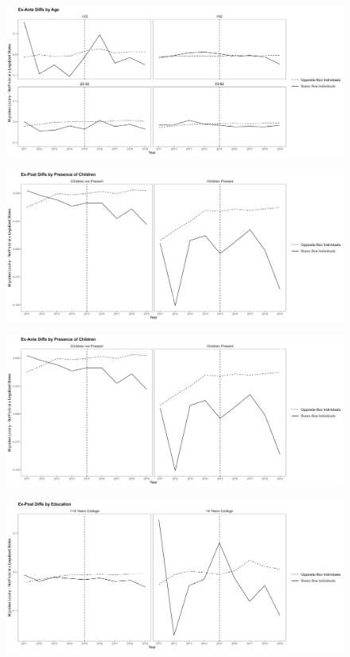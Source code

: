 \documentclass[12pt,letterpaper]{article}
\begin{document}
\begin{figure}[h]
    \centering
    \includegraphics[width=0.75\linewidth]{outputs/summary_stats/age_ante_diffs.png}
    \caption{}
    \label{fig: fig:enter-label}
\end{figure}


\begin{figure}[h]
    \centering
    \includegraphics[width=0.75\linewidth]{outputs/summary_stats/child_post_diffs.png}
    \caption{}
    \label{fig: fig:enter-label}
\end{figure}

\begin{figure}[h]
    \centering
    \includegraphics[width=0.75\linewidth]{outputs/summary_stats/child_ante_diffs.png}
    \caption{}
    \label{fig: fig:enter-label}
\end{figure}

\begin{figure}[h]
    \centering
    \includegraphics[width=0.75\linewidth]{outputs/summary_stats/educ_post_diffs.png}
    \caption{}
    \label{fig: fig:enter-label}
\end{figure}
\end{document}
